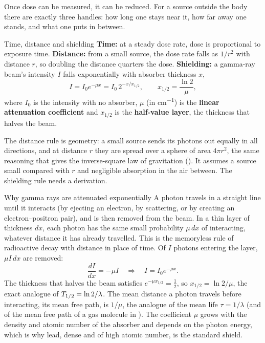 Once dose can be measured, it can be reduced. For a source outside the body there are exactly three
handles: how long one stays near it, how far away one stands, and what one puts in between.

\begin{keybox}{Time, distance and shielding}
\textbf{Time:} at a steady dose rate, dose is proportional to exposure time.
\textbf{Distance:} from a small source, the dose rate falls as $1/r^2$ with distance $r$, so doubling the
distance quarters the dose.
\textbf{Shielding:} a gamma-ray beam's intensity $I$ falls exponentially with absorber thickness $x$,
\[
I=I_0e^{-\mu x}=I_0\,2^{-x/x_{1/2}},\qquad x_{1/2}=\frac{\ln2}{\mu},
\]
where $I_0$ is the intensity with no absorber, $\mu$ (in \si{cm^{-1}}) is the \textbf{linear
attenuation coefficient} and $x_{1/2}$ is the \textbf{half-value layer}, the thickness that halves the beam.
\end{keybox}

The distance rule is geometry: a small source sends its photons out equally in all directions, and at
distance $r$ they are spread over a sphere of area $4\pi r^2$, the same reasoning that gives the
inverse-square law of gravitation (). It assumes a source small compared with $r$ and
negligible absorption in the air between. The shielding rule needs a derivation.

\begin{derivbox}{Why gamma rays are attenuated exponentially}
A photon travels in a straight line until it interacts (by ejecting an electron, by scattering, or by
creating an electron--positron pair), and is then removed from the beam. In a thin layer of thickness
$dx$, each photon has the same small probability $\mu\,dx$ of interacting, whatever distance it has
already travelled. This is the memoryless rule of radioactive decay with distance in place of time. Of
$I$ photons entering the layer, $\mu I\,dx$ are removed:
\[
\frac{dI}{dx}=-\mu I\quad\Longrightarrow\quad I=I_0e^{-\mu x}.
\]
The thickness that halves the beam satisfies $e^{-\mu x_{1/2}}=\tfrac12$, so $x_{1/2}=\ln2/\mu$, the exact
analogue of $T_{1/2}=\ln2/\lambda$. The mean distance a photon travels before interacting, its mean free
path, is $1/\mu$, the analogue of the mean life $\tau=1/\lambda$ (and of the mean free path of a gas
molecule in ). The coefficient $\mu$ grows with the density and atomic number of the
absorber and depends on the photon energy, which is why lead, dense and of high atomic number, is the
standard shield.
\end{derivbox}

